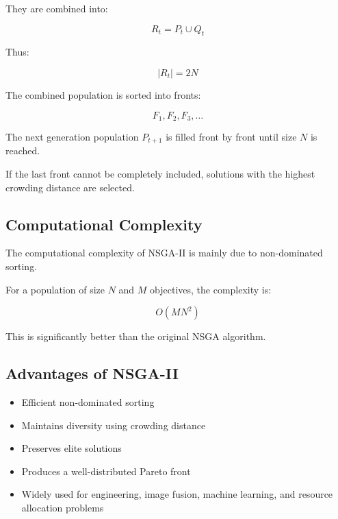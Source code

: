 \documentclass[11pt]{article}
\begin{document}
They are combined into:

\begin{equation}
R_t = P_t \cup Q_t
\end{equation}

Thus:

\begin{equation}
|R_t| = 2N
\end{equation}

The combined population is sorted into fronts:

\begin{equation}
F_1, F_2, F_3, \dots
\end{equation}

The next generation population $P_{t+1}$ is filled front by front until size $N$ is reached.

If the last front cannot be completely included, solutions with the highest crowding distance are selected.

\subsection{Computational Complexity}

The computational complexity of NSGA-II is mainly due to non-dominated sorting.

For a population of size $N$ and $M$ objectives, the complexity is:

\begin{equation}
O(MN^2)
\end{equation}

This is significantly better than the original NSGA algorithm.

\subsection{Advantages of NSGA-II}

\begin{itemize}
    \item Efficient non-dominated sorting
    \item Maintains diversity using crowding distance
    \item Preserves elite solutions
    \item Produces a well-distributed Pareto front
    \item Widely used for engineering, image fusion, machine learning, and resource allocation problems
\end{itemize}
\end{document}
